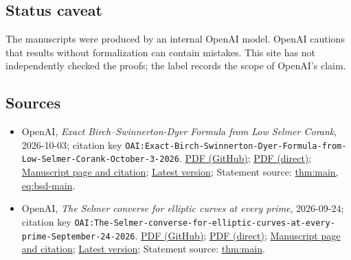 \documentclass[11pt]{article}
\begin{document}
\subsection{Status caveat}
The manuscripts were produced by an internal OpenAI model. OpenAI cautions that results without formalization can contain mistakes. This site has not independently checked the proofs; the label records the scope of OpenAI's claim.

\subsection{Sources}
\begin{itemize}
\item OpenAI, \emph{Exact Birch–Swinnerton-Dyer Formula from Low Selmer Corank}, 2026-10-03; citation key \texttt{OAI:Exact-Birch-Swinnerton-Dyer-Formula-from-Low-Selmer-Corank-October-3-2026}. \href{https://github.com/openai/math/blob/adc7f1241b42e322a6451854ab7e4b4c146bf78a/preprints/Exact-Birch-Swinnerton-Dyer-Formula-from-Low-Selmer-Corank-October-3-2026/exact-bsd-low-selmer-corank.pdf}{PDF (GitHub)}; \href{https://github.com/openai/math/raw/adc7f1241b42e322a6451854ab7e4b4c146bf78a/preprints/Exact-Birch-Swinnerton-Dyer-Formula-from-Low-Selmer-Corank-October-3-2026/exact-bsd-low-selmer-corank.pdf}{PDF (direct)}; \href{https://github.com/openai/math/blob/adc7f1241b42e322a6451854ab7e4b4c146bf78a/preprints/Exact-Birch-Swinnerton-Dyer-Formula-from-Low-Selmer-Corank-October-3-2026/README.md}{Manuscript page and citation}; \href{https://github.com/openai/math/blob/main/preprints/Exact-Birch-Swinnerton-Dyer-Formula-from-Low-Selmer-Corank-October-3-2026/exact-bsd-low-selmer-corank.pdf}{Latest version}; Statement source: \href{https://github.com/openai/math/blob/adc7f1241b42e322a6451854ab7e4b4c146bf78a/preprints/Exact-Birch-Swinnerton-Dyer-Formula-from-Low-Selmer-Corank-October-3-2026/build/sections/01-introduction.tex\#L47}{thm:main, eq:bsd-main}.
\item OpenAI, \emph{The Selmer converse for elliptic curves at every prime}, 2026-09-24; citation key \texttt{OAI:The-Selmer-converse-for-elliptic-curves-at-every-prime-September-24-2026}. \href{https://github.com/openai/math/blob/adc7f1241b42e322a6451854ab7e4b4c146bf78a/preprints/The-Selmer-converse-for-elliptic-curves-at-every-prime-September-24-2026/main.pdf}{PDF (GitHub)}; \href{https://github.com/openai/math/raw/adc7f1241b42e322a6451854ab7e4b4c146bf78a/preprints/The-Selmer-converse-for-elliptic-curves-at-every-prime-September-24-2026/main.pdf}{PDF (direct)}; \href{https://github.com/openai/math/blob/adc7f1241b42e322a6451854ab7e4b4c146bf78a/preprints/The-Selmer-converse-for-elliptic-curves-at-every-prime-September-24-2026/README.md}{Manuscript page and citation}; \href{https://github.com/openai/math/blob/main/preprints/The-Selmer-converse-for-elliptic-curves-at-every-prime-September-24-2026/main.pdf}{Latest version}; Statement source: \href{https://github.com/openai/math/blob/adc7f1241b42e322a6451854ab7e4b4c146bf78a/preprints/The-Selmer-converse-for-elliptic-curves-at-every-prime-September-24-2026/build/sections/01-introduction.tex\#L25}{thm:main}.

\end{itemize}
\end{document}

